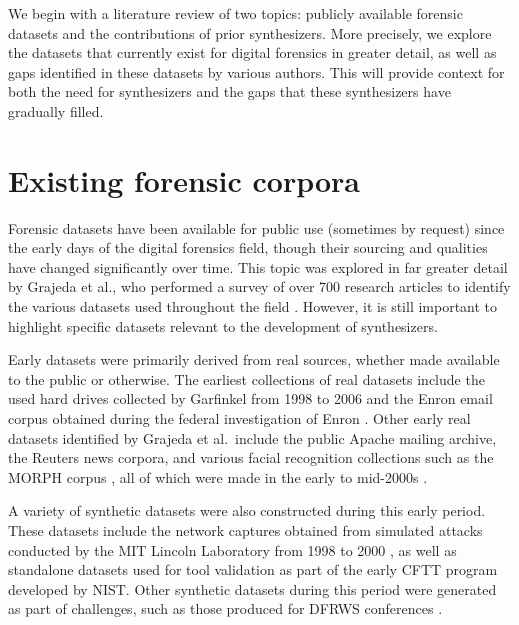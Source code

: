 We begin with a literature review of two topics: publicly available
forensic datasets and the contributions of prior synthesizers. More
precisely, we explore the datasets that currently exist for digital
forensics in greater detail, as well as gaps identified in these
datasets by various authors. This will provide context for both the need
for synthesizers and the gaps that these synthesizers have gradually
filled.

\section{Existing forensic
corpora}\label{existing-forensic-corpora}

Forensic datasets have been available for public use (sometimes by
request) since the early days of the digital forensics field, though
their sourcing and qualities have changed significantly over time. This
topic was explored in far greater detail by Grajeda et al., who
performed a survey of over 700 research articles to identify the various
datasets used throughout the field
\cite{grajedaAvailabilityDatasetsDigital2017}. However, it is still
important to highlight specific datasets relevant to the development of
synthesizers.

Early datasets were primarily derived from real sources, whether made
available to the public or otherwise. The earliest collections of real
datasets include the used hard drives collected by Garfinkel from 1998
to 2006 and the Enron email corpus obtained during the federal
investigation of Enron \cite{garfinkelForensicCorporaChallenge2007}.
Other early real datasets identified by Grajeda et al.~include the
public Apache mailing archive, the Reuters news corpora, and various
facial recognition collections such as the MORPH corpus
\cite{ricanekMORPHLongitudinalImage2006}, all of which were made in
the early to mid-2000s
\cite{yannikosDataCorporaDigital2014,grajedaAvailabilityDatasetsDigital2017}.

A variety of synthetic datasets were also constructed during this early
period. These datasets include the network captures obtained from
simulated attacks conducted by the MIT Lincoln Laboratory from 1998 to
2000 \cite{garfinkelForensicCorporaChallenge2007}, as well as
standalone datasets used for tool validation as part of the early CFTT
program developed by NIST. Other synthetic datasets during this period
were generated as part of challenges, such as those produced for DFRWS
conferences \cite{woodsCreatingRealisticCorpora2011}.

